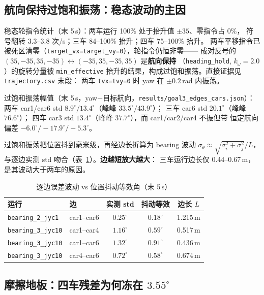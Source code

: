 \documentclass[11pt,a4paper]{ctexart}
\newcommand{\run}[1]{\texttt{#1}}
\newcommand{\file}[1]{\texttt{#1}}
\newcommand{\degC}{^\circ}
\begin{document}
\subsection{航向保持过饱和振荡：稳态波动的主因}
\label{sec:limitcycle}

稳态轮指令统计（末 5\,s）：两车运行 100\% 处于抬升值 $\pm35$、零指令占 0\%，
符号翻转 3.3--3.8 次/s；三车 84--100\% 抬升；四车 75--100\% 抬升。
两车平移指令已被死区清零（\texttt{target\_vx=target\_vy=0}），轮指令仍恒非零——
成对反号的 $(35,-35,35,-35)\leftrightarrow(-35,35,-35,35)$ 是\textbf{航向保持}
（\texttt{heading\_hold}, $k_\omega=2.0$）的旋转分量被 \texttt{min\_effective}
抬升的结果，构成过饱和振荡。直接证据见 \file{trajectory.csv} 末段：
两车 \texttt{tvx=tvy=0} 时 yaw 在 $\pm0.2$\,rad 内振荡。

过饱和振荡幅值（末 5\,s，yaw$-$目标航向，\file{results/goal3\_edges\_cars.json}）：
两车 car1/car6 std $8.9\degC/13.4\degC$（峰峰 $33.5\degC/43.9\degC$）；
三车 car6 std $20.1\degC$（峰峰 $76.6\degC$）；
四车 car3 std $13.4\degC$（峰峰 $37.7\degC$），而 car1/car2/car4 不振但带
恒定航向偏差 $-6.0\degC/-17.9\degC/-5.3\degC$。

过饱和振荡把位置抖到毫米级，再经边长折算为 bearing 波动
$\sigma_\theta\approx\sqrt{\sigma_i^2+\sigma_j^2}/L$，
与逐边实测 std 吻合（表~\ref{tab:jitter}）。\textbf{边越短放大越大}：
三车运行边长仅 0.44--0.67\,m，是其波动大于两车的原因。

\begin{table}[H]
\centering\small
\caption{逐边误差波动 vs 位置抖动等效角（末 5\,s）}
\label{tab:jitter}
\begin{tabular}{llccc}
\toprule
运行 & 边 & 实测 std & 抖动等效 & 边长 $L$ \\
\midrule
\run{bearing\_2\_jyc1} & car1--car6 & $0.25\degC$ & $0.18\degC$ & 1.215\,m \\
\run{bearing\_3\_jyc10} & car1--car4 & $1.16\degC$ & $0.59\degC$ & 0.517\,m \\
\run{bearing\_3\_jyc10} & car1--car6 & $1.32\degC$ & $0.91\degC$ & 0.436\,m \\
\run{bearing\_3\_jyc10} & car4--car6 & $0.72\degC$ & $0.58\degC$ & 0.674\,m \\
\bottomrule
\end{tabular}
\end{table}

\subsection{摩擦地板：四车残差为何冻在 \texorpdfstring{$3.55\degC$}{3.55°}}
\label{sec:floor}
\end{document}
